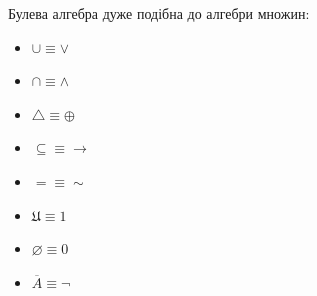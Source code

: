 \begin{remark}
    Булева алгебра дуже подібна до алгебри множин:
    \begin{multicols}{4}
        \begin{itemize}
            \item $\cup \equiv \vee$
            \item $\cap \equiv \wedge$
            \item $\triangle \equiv \oplus$
            \item $\subseteq \equiv \rightarrow$
            \item $= \equiv \sim$
            \item $\mathfrak{U} \equiv 1$
            \item $\varnothing \equiv 0$
            \item $\overline{A} \equiv \neg$
        \end{itemize}
    \end{multicols}


\end{remark}

